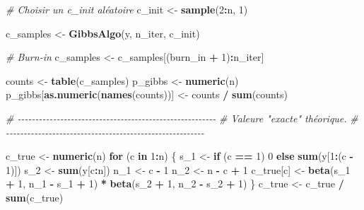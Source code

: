 \documentclass[
]{article}
\newenvironment{Shaded}{\begin{snugshade}}{\end{snugshade}}
\newcommand{\CommentTok}[1]{\textcolor[rgb]{0.56,0.35,0.01}{\textit{#1}}}
\newcommand{\ControlFlowTok}[1]{\textcolor[rgb]{0.13,0.29,0.53}{\textbf{#1}}}
\newcommand{\DecValTok}[1]{\textcolor[rgb]{0.00,0.00,0.81}{#1}}
\newcommand{\FunctionTok}[1]{\textcolor[rgb]{0.13,0.29,0.53}{\textbf{#1}}}
\newcommand{\NormalTok}[1]{#1}
\newcommand{\OtherTok}[1]{\textcolor[rgb]{0.56,0.35,0.01}{#1}}
\newcommand{\SpecialCharTok}[1]{\textcolor[rgb]{0.81,0.36,0.00}{\textbf{#1}}}
\begin{document}
\begin{Shaded}
\begin{Highlighting}[]
\CommentTok{\# Choisir un c\_init aléatoire}
\NormalTok{c\_init }\OtherTok{\textless{}{-}} \FunctionTok{sample}\NormalTok{(}\DecValTok{2}\SpecialCharTok{:}\NormalTok{n, }\DecValTok{1}\NormalTok{)}

\NormalTok{c\_samples }\OtherTok{\textless{}{-}} \FunctionTok{GibbsAlgo}\NormalTok{(y, n\_iter, c\_init)}

\CommentTok{\# Burn{-}in}
\NormalTok{c\_samples }\OtherTok{\textless{}{-}}\NormalTok{ c\_samples[(burn\_in }\SpecialCharTok{+} \DecValTok{1}\NormalTok{)}\SpecialCharTok{:}\NormalTok{n\_iter]}



\NormalTok{counts }\OtherTok{\textless{}{-}} \FunctionTok{table}\NormalTok{(c\_samples)}
\NormalTok{p\_gibbs }\OtherTok{\textless{}{-}} \FunctionTok{numeric}\NormalTok{(n)}
\NormalTok{p\_gibbs[}\FunctionTok{as.numeric}\NormalTok{(}\FunctionTok{names}\NormalTok{(counts))] }\OtherTok{\textless{}{-}}\NormalTok{ counts }\SpecialCharTok{/} \FunctionTok{sum}\NormalTok{(counts)}

\CommentTok{\# {-}{-}{-}{-}{-}{-}{-}{-}{-}{-}{-}{-}{-}{-}{-}{-}{-}{-}{-}{-}{-}{-}{-}{-}{-}{-}{-}{-}{-}{-}{-}{-}{-}{-}{-}{-}{-}{-}{-}{-}{-}{-}{-}{-}{-}{-}{-}{-}{-}{-}{-}{-}{-}{-}{-}{-}}
\CommentTok{\# Valeure "exacte" théorique.}
\CommentTok{\# {-}{-}{-}{-}{-}{-}{-}{-}{-}{-}{-}{-}{-}{-}{-}{-}{-}{-}{-}{-}{-}{-}{-}{-}{-}{-}{-}{-}{-}{-}{-}{-}{-}{-}{-}{-}{-}{-}{-}{-}{-}{-}{-}{-}{-}{-}{-}{-}{-}{-}{-}{-}{-}{-}{-}{-}}

\NormalTok{c\_true }\OtherTok{\textless{}{-}} \FunctionTok{numeric}\NormalTok{(n)}
\ControlFlowTok{for}\NormalTok{ (c }\ControlFlowTok{in} \DecValTok{1}\SpecialCharTok{:}\NormalTok{n) \{}
\NormalTok{  s\_1 }\OtherTok{\textless{}{-}} \ControlFlowTok{if}\NormalTok{ (c }\SpecialCharTok{==} \DecValTok{1}\NormalTok{) }\DecValTok{0} \ControlFlowTok{else} \FunctionTok{sum}\NormalTok{(y[}\DecValTok{1}\SpecialCharTok{:}\NormalTok{(c }\SpecialCharTok{{-}} \DecValTok{1}\NormalTok{)])}
\NormalTok{  s\_2 }\OtherTok{\textless{}{-}} \FunctionTok{sum}\NormalTok{(y[c}\SpecialCharTok{:}\NormalTok{n])}
\NormalTok{  n\_1 }\OtherTok{\textless{}{-}}\NormalTok{ c }\SpecialCharTok{{-}} \DecValTok{1}
\NormalTok{  n\_2 }\OtherTok{\textless{}{-}}\NormalTok{ n }\SpecialCharTok{{-}}\NormalTok{ c }\SpecialCharTok{+} \DecValTok{1}
\NormalTok{  c\_true[c] }\OtherTok{\textless{}{-}} \FunctionTok{beta}\NormalTok{(s\_1 }\SpecialCharTok{+} \DecValTok{1}\NormalTok{, n\_1 }\SpecialCharTok{{-}}\NormalTok{ s\_1 }\SpecialCharTok{+} \DecValTok{1}\NormalTok{) }\SpecialCharTok{*} \FunctionTok{beta}\NormalTok{(s\_2 }\SpecialCharTok{+} \DecValTok{1}\NormalTok{, n\_2 }\SpecialCharTok{{-}}\NormalTok{ s\_2 }\SpecialCharTok{+} \DecValTok{1}\NormalTok{)}
\NormalTok{\}}
\NormalTok{c\_true }\OtherTok{\textless{}{-}}\NormalTok{ c\_true }\SpecialCharTok{/} \FunctionTok{sum}\NormalTok{(c\_true)}


\end{Highlighting}
\end{Shaded}
\end{document}
